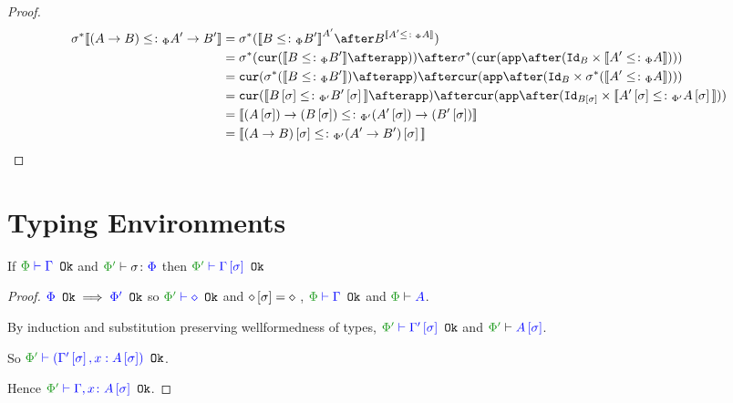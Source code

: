 \documentclass{report}
\begin{document}
\begin{framed}
\begin{proof}
        \begin{align*}
            \si\star\deno{(\ab)\subtypep\fntype{A'}{B'}} &= \si\star(\deno{B\subtypep B'}^{A'}\after B^{\deno{A'\subtypep A}})\\
            &= \si\star(\cur{\deno{B\subtypep B'}\after\app})\after\si\star(\cur{\app\after(\Id{B}\times\deno{A'\subtypep A})})\\
            & = \cur{\si\star(\deno{B\subtypep B'})\after\app}\after\cur{\app\after(\Id{B}\times\si\star(\deno{A'\subtypep A}))}\\
            & = \cur{\deno{B\ssi\subtypepp B'\ssi}\after\app}\after\cur{\app\after(\Id{B\ssi}\times\deno{A'\ssi\subtypepp A\ssi})}\\
            &= \deno{\fntype{(A\ssi)}{(B\ssi)}\subtypepp\fntype{(A'\ssi)}{(B'\ssi)}}\\
            &= \deno{(\ab)\ssi\subtypepp(\fntype{A'}{B'})\ssi}
        \end{align*}
    \end{proof}
\end{framed}

\section{Typing Environments}

\begin{theorem}
    If $\wellformedok{\P}{\G}$ and $\typerelation{\P'}{\si}{\P}$ then $\wellformedok{\P'}{\G\ssi}$
    
\end{theorem}

\begin{framed}   
    \begin{proof}
        ${\color{blue} \Phi} \texttt{ Ok}\implies{\color{blue} \Phi'} \texttt{ Ok}$ so $\wellformedok{\P'}{\nil}$
        and $\diamond\left[\sigma\right] = \diamond$
        \bi, $\wellformedok{\P}{\G}$ and $\wellformed{\P}{A}$.
        
        By induction and substitution preserving wellformedness of types, $\wellformedok{\P'}{\G'\ssi}$ and $\wellformed{\P'}{A\ssi}$.
        
        
        So $\wellformedok{\P'}{(\G'\ssi, x: A\ssi)}$.
        
        Hence $\wellformedok{\P'}{\gax\ssi}$.
    \end{proof}
    
\end{framed}
\end{document}
